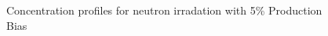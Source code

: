 \documentclass[a4paper]{article}
\begin{document}
      \begin{figure}[h!]  %
        \centering
        \qquad
        \caption{Concentration profiles for neutron irradation with 5\% Production Bias}
        \label{figure:concentrations_neutron_5_1e-6}
      \end{figure}
\end{document}
